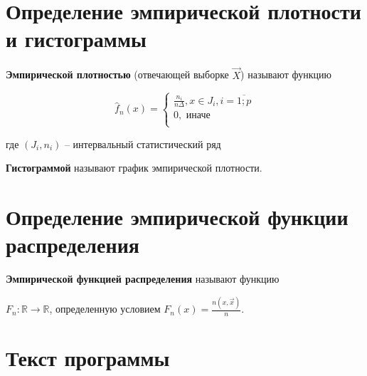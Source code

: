 \documentclass[a4paper,14pt]{extreport} %
\begin{document}
\section{Определение эмпирической плотности и гистограммы}

\hfill 

    \textbf{Эмпирической плотностью} (отвечающей выборке $\vec X$) называют функцию

    \begin{equation*}
        \hat f_n(x) =
        \begin{cases}
            \frac{n_i}{n \Delta}, x \in J_i, i = \overline{1; p} \\
            0, \text{ иначе} \\
        \end{cases}
    \end{equation*}

где $(J_i, n_i)$ -- интервальный статистический ряд

\hfill

\textbf{Гистограммой} называют график эмпирической плотности. 

\section{Определение эмпирической функции распределения}

\hfill 

\textbf{Эмпирической функцией распределения} называют функцию 

$F_n : \mathbb{R} \to \mathbb{R}$, определенную условием $F_n(x) = \frac{n(x, \vec x)}{n}$. 

\section{Текст программы}

\hfill 
\end{document}
